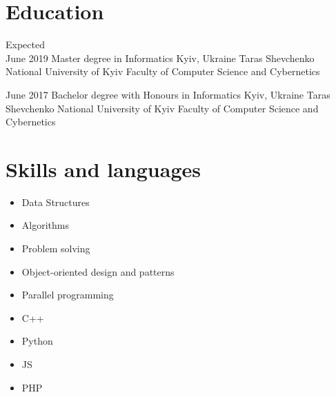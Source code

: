 \documentclass[letterpaper]{twentysecondcv} %
\begin{document}
\makeprofile %

\section{Education}

\begin{twenty} %
	\twentyitem
    	{Expected \\ June 2019}
        {Master degree in Informatics}
        {Kyiv, Ukraine}
        {Taras Shevchenko National University of Kyiv}
        {Faculty of Computer Science and Cybernetics}
        
	\twentyitem
    	{June 2017}
        {Bachelor degree with Honours in Informatics}
        {Kyiv, Ukraine}
        {Taras Shevchenko National University of Kyiv}
        {Faculty of Computer Science and Cybernetics}
        
\end{twenty}


\section{Skills and languages}
\begin{multicols}{2}
\begin{itemize}
    \item {Data Structures}
    \item {Algorithms}
    \item {Problem solving}
	\item {Object-oriented design and patterns}
	\item {Parallel programming}
	\item {C++}
	\item {Python}
	\item {JS}
	\item {PHP}
\end{itemize}
\end{multicols}

\end{document}
